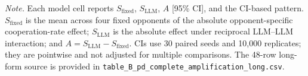 \begin{table}[t]
\begin{tabular}{lp{3.35cm}p{3.35cm}p{3.35cm}p{3.35cm}}
\bottomrule
\end{tabular}
\vspace{2pt}
\parbox{0.99\textwidth}{\scriptsize \textit{Note.} Each model cell reports $S_{\mathrm{fixed}}$, $S_{\mathrm{LLM}}$, $A$ [95\% CI], and the CI-based pattern. $S_{\mathrm{fixed}}$ is the mean across four fixed opponents of the absolute opponent-specific cooperation-rate effect; $S_{\mathrm{LLM}}$ is the absolute effect under reciprocal LLM--LLM interaction; and $A=S_{\mathrm{LLM}}-S_{\mathrm{fixed}}$. CIs use 30 paired seeds and 10,000 replicates; they are pointwise and not adjusted for multiple comparisons. The 48-row long-form source is provided in \texttt{table\_B\_pd\_complete\_amplification\_long.csv}.}
\end{table}
